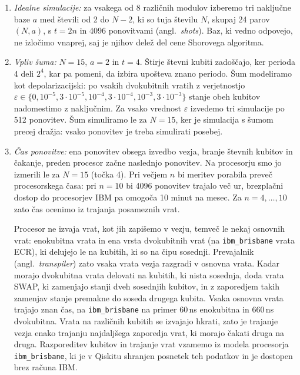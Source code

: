 \begin{enumerate}
\item \emph{Idealne simulacije:} za vsakega od 8 različnih modulov izberemo tri naključne baze $a$ med števili od 2 do $N-2$, ki so tuja številu $N$, skupaj 24 parov $(N, a)$, s $t = 2n$ in 4096 ponovitvami (angl.\ \emph{shots}). Baz, ki vedno odpovejo, ne izločimo vnaprej, saj je njihov delež del cene Shorovega algoritma.
\item \emph{Vpliv šuma:} $N = 15$, $a = 2$ in $t = 4$. Štirje števni kubiti zadoščajo, ker perioda 4 deli $2^4$, kar pa pomeni, da izbira upošteva znano periodo. Šum modeliramo kot depolarizacijski: po vsakih dvokubitnih vratih z verjetnostjo $\varepsilon \in \{0, 10^{-5}, 3 \cdot 10^{-5}, 10^{-4}, 3 \cdot 10^{-4}, 10^{-3}, 3 \cdot 10^{-3}\}$ stanje obeh kubitov nadomestimo z naključnim. Za vsako vrednost $\varepsilon$ izvedemo tri simulacije po 512 ponovitev. Šum simuliramo le za $N = 15$, ker je simulacija s šumom precej dražja: vsako ponovitev je treba simulirati posebej.
\item \emph{Čas ponovitve:} ena ponovitev obsega izvedbo vezja, branje števnih kubitov in čakanje, preden procesor začne naslednjo ponovitev. Na procesorju smo jo izmerili le za $N = 15$ (točka 4). Pri večjem $n$ bi meritev porabila preveč procesorskega časa: pri $n = 10$ bi 4096 ponovitev trajalo več ur, brezplačni dostop do procesorjev IBM pa omogoča 10 minut na mesec. Za $n = 4, \dots, 10$ zato čas ocenimo iz trajanja posameznih vrat.

Procesor ne izvaja vrat, kot jih zapišemo v vezju, temveč le nekaj osnovnih vrat: enokubitna vrata in ena vrsta dvokubitnih vrat (na \texttt{ibm\_brisbane} vrata ECR), ki delujejo le na kubitih, ki so na čipu sosednji. Prevajalnik (angl.\ \emph{transpiler}) zato vsaka vrata vezja razgradi v osnovna vrata. Kadar morajo dvokubitna vrata delovati na kubitih, ki nista sosednja, doda vrata SWAP, ki zamenjajo stanji dveh sosednjih kubitov, in z zaporedjem takih zamenjav stanje premakne do soseda drugega kubita. Vsaka osnovna vrata trajajo znan čas, na \texttt{ibm\_brisbane} na primer 60\,ns enokubitna in 660\,ns dvokubitna. Vrata na različnih kubitih se izvajajo hkrati, zato je trajanje vezja enako trajanju najdaljšega zaporedja vrat, ki morajo čakati druga na druga. Razporeditev kubitov in trajanje vrat vzamemo iz modela procesorja \texttt{ibm\_brisbane}, ki je v Qiskitu shranjen posnetek teh podatkov in je dostopen brez računa IBM.


\end{enumerate}
